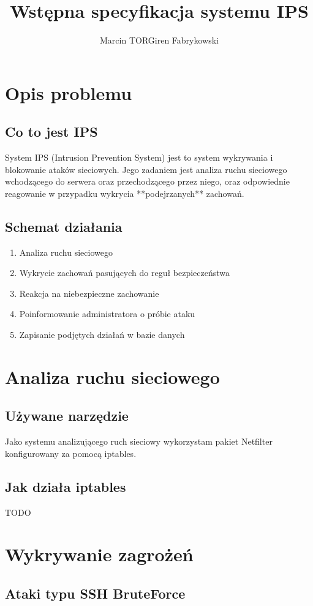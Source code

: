 \documentclass[a4paper,10pt]{article}
\author{Marcin TORGiren Fabrykowski}
\title{Wstępna specyfikacja systemu IPS}
\begin{document}
\maketitle
\newpage
\tableofcontents
\newpage
\section{Opis problemu}
	\subsection{Co to jest IPS}
		System IPS (Intrusion Prevention System) jest to system wykrywania i blokowanie ataków sieciowych.
		Jego zadaniem jest analiza ruchu sieciowego wchodzącego do serwera oraz przechodzącego przez niego, oraz odpowiednie reagowanie w przypadku wykrycia **podejrzanych** zachowań.
	\subsection{Schemat działania}
		\begin{enumerate}
		\item Analiza ruchu sieciowego
		\item Wykrycie zachowań pasujących do reguł bezpieczeństwa
		\item Reakcja na niebezpieczne zachowanie
		\item Poinformowanie administratora o próbie ataku
		\item Zapisanie podjętych działań w bazie danych
		\end{enumerate}
\section{Analiza ruchu sieciowego}
	\subsection{Używane narzędzie}
		Jako systemu analizującego ruch sieciowy wykorzystam pakiet Netfilter konfigurowany za pomocą iptables.
	\subsection{Jak działa iptables}
		TODO
\section{Wykrywanie zagrożeń}
	\subsection{Ataki typu SSH BruteForce}
\end{document}
